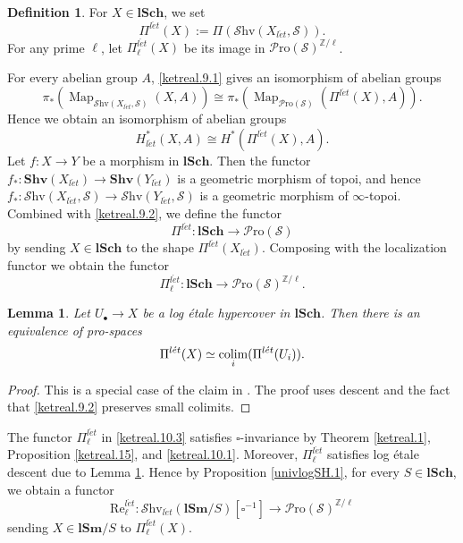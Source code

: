 \documentclass[11pt, a4paper]{amsart}
\newtheorem{lem}[thm]{Lemma}
\theoremstyle{definition}
\newtheorem{df}[thm]{Definition}
\numberwithin{equation}{subsection}
\newcommand{\Z}{\mathbb{Z}}
\newcommand{\lSch}{\mathbf{lSch}}
\newcommand{\lSm}{\mathbf{lSm}}
\newcommand{\Shv}{\mathbf{Shv}}
\newcommand{\colimit}{\mathop{\rm colim}}
\newcommand{\Real}{\mathrm{Re}}
\newcommand{\leta}{{l\acute{e}t}}
\newcommand{\boxx}{\square}
\newcommand{\infSpc}{\mathcal{S}}
\newcommand{\infShv}{\mathcal{S}\mathrm{hv}}
\newcommand{\infPro}{\mathcal{P}\mathrm{ro}}
\newcommand{\Map}{\operatorname{Map}}
\begin{document}
\begin{df}
\label{ketreal.10}
For $X\in \lSch$, we set\index[notation]{Pilet @ $\Pi^{\leta}$}
\[
\Pi^{\leta}(X)
:=
\Pi(\infShv(X_{\leta},\infSpc)).
\]
For any prime $\ell$, let $\Pi_{\ell}^{\leta}(X)$ be its image in $\infPro(\infSpc)^{\Z/\ell}$.
\end{df}

For every abelian group $A$, 
\eqref{ketreal.9.1} gives an isomorphism of abelian groups
\[
\pi_*(\Map_{\infShv(X_{\leta},\infSpc)}(X,A))
\cong
\pi_*(\Map_{\infPro(\infSpc)}(\Pi^{\leta}(X),A)).
\]
Hence we obtain an isomorphism of abelian groups
\begin{equation}
\label{ketreal.10.1}
H_{\leta}^*(X,A)
\cong
H^*(\Pi^{\leta}(X),A).
\end{equation}
Let $f\colon X\to Y$ be a morphism in $\lSch$.
Then the 
functor $f_*\colon\Shv(X_{\leta})\to \Shv(Y_{\leta})$ is a geometric morphism of topoi, 
and hence $f_*\colon \infShv(X_{\leta},\infSpc)\to \infShv(Y_{\leta},\infSpc)$ is a geometric morphism of $\infty$-topoi.
Combined with \eqref{ketreal.9.2}, 
we define the functor 
\begin{equation}
\label{ketreal.10.2}
\Pi^{\leta}
\colon
\lSch \to \infPro(\infSpc)
\end{equation}
by sending $X\in \lSch$ to the shape $\Pi^{\leta}(X_{\leta})$.
Composing with the localization functor we obtain the functor
\begin{equation}
\label{ketreal.10.3}
\Pi_{\ell}^\leta
\colon
\lSch\to \infPro(\infSpc)^{\Z/\ell}.
\end{equation}


\begin{lem}
\label{ketreal.17}
Let $U_\bullet \to X$ be a log \'etale hypercover in $\lSch$.
Then there is an equivalence of pro-spaces
\[
\Pi^{\leta}(X)
\simeq
\colimit_i(\Pi^{\leta}(U_i)).
\]
\end{lem}
\begin{proof}
This is a special case of the claim in \cite[Remark 1.6]{Hoyoisetalesymmetric}.
The proof uses descent and the fact that \eqref{ketreal.9.2} preserves small colimits.
\end{proof}

The functor $\Pi_{\ell}^\leta$ in \eqref{ketreal.10.3} satisfies $\boxx$-invariance by Theorem \ref{ketreal.1}, 
Proposition \ref{ketreal.15}, and \eqref{ketreal.10.1}.
Moreover, 
$\Pi_{\ell}^\leta$ satisfies log \'etale descent due to Lemma \ref{ketreal.17}.
Hence by Proposition \ref{univlogSH.1}, 
for every $S\in \lSch$, 
we obtain a functor\index{Rellet @ $\Real_{\ell}^{\leta}$}
\begin{equation}
\label{ketreal.17.1}
\Real_{\ell}^{\leta}
\colon
\infShv_{\leta}(\lSm/S)[\square^{-1}]
\to
\infPro(\infSpc)^{\Z/\ell}
\end{equation}
sending $X\in \lSm/S$ to $\Pi_{\ell}^\leta(X)$.
\end{document}

